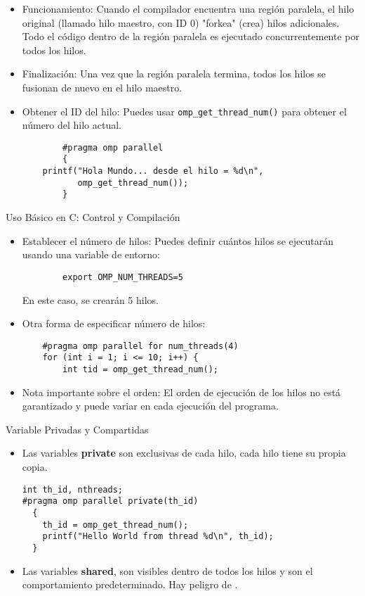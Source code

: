 \documentclass{beamer}
\begin{document}
\begin{frame}[containsverbatim]
    \begin{itemize}
        \item Funcionamiento: Cuando el compilador encuentra una región paralela, el hilo original (llamado hilo maestro, con ID 0) "forkea" (crea) hilos adicionales. Todo el código dentro de la región paralela es ejecutado concurrentemente por todos los hilos.
        \item Finalización: Una vez que la región paralela termina, todos los hilos se fusionan de nuevo en el hilo maestro.
        \item Obtener el ID del hilo: Puedes usar \texttt{omp\_get\_thread\_num()} para obtener el número del hilo actual.
            \begin{verbatim}
        #pragma omp parallel
        {
    printf("Hola Mundo... desde el hilo = %d\n",
           omp_get_thread_num());
        }
    \end{verbatim}
    \end{itemize}
\end{frame}

\begin{frame}[containsverbatim]{Uso Básico en C: Control y Compilación}
    \begin{itemize}
        \item Establecer el número de hilos: Puedes definir cuántos hilos se ejecutarán usando una variable de entorno:
        \begin{verbatim}
        export OMP_NUM_THREADS=5
        \end{verbatim}
        En este caso, se crearán 5 hilos.
        \item Otra forma de especificar número de hilos:
            \begin{verbatim}
    #pragma omp parallel for num_threads(4)
    for (int i = 1; i <= 10; i++) {
        int tid = omp_get_thread_num();
    \end{verbatim}
        \item Nota importante sobre el orden: El orden de ejecución de los hilos no está garantizado y puede variar en cada ejecución del programa.
    \end{itemize}
\end{frame}


\begin{frame}[containsverbatim]{Variable Privadas y Compartidas}
    \begin{itemize}
        \item Las variables \textbf{private} son exclusivas de cada hilo, cada hilo tiene su propia copia. 
            \begin{verbatim}
int th_id, nthreads;
#pragma omp parallel private(th_id)
  {
    th_id = omp_get_thread_num();
    printf("Hello World from thread %d\n", th_id);
  }
    \end{verbatim}
\item Las variables \textbf{shared}, son visibles dentro de todos los hilos y son el comportamiento predeterminado. Hay peligro de \color{red}{Race Conditions}.
    \end{itemize}
\end{frame}
\end{document}
